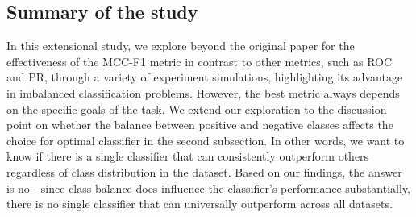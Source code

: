 \documentclass[12pt, oneside]{amsart}
\theoremstyle{definition}
\theoremstyle{remark}
\numberwithin{equation}{section}
\begin{document}
\subsection{Summary of the study}
In this extensional study, we explore beyond the original paper for the effectiveness of the MCC-F1 metric in contrast to other metrics, such as ROC and PR, through a variety of experiment simulations, highlighting its advantage in imbalanced classification problems. However, the best metric always depends on the specific goals of the task.  We extend our exploration to the discussion point on whether the balance between positive and negative classes affects the choice for optimal classifier in the second subsection. In other words, we want to know if there is a single classifier that can consistently outperform others regardless of class distribution in the dataset. Based on our findings, the answer is no - since class balance does influence the classifier's performance substantially, there is no single classifier that can universally outperform across all datasets. 

\clearpage
\printbibliography
\end{document}
